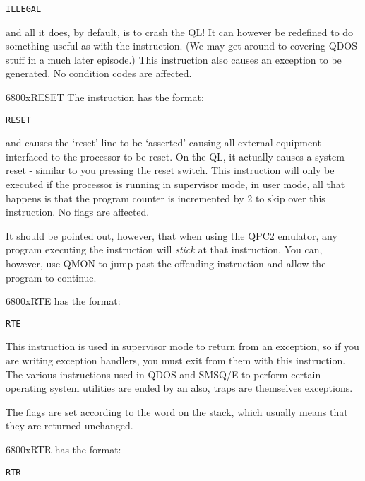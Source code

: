\begin{lstlisting}[firstnumber=1,]
          ILLEGAL
\end{lstlisting}

and all it does, by default, is to crash the QL! It can however
      be redefined to do something useful as with the  instruction. (We may
      get around to covering QDOS stuff in a much later episode.) This
      instruction also causes an exception to be generated. No condition codes
      are affected.
      
      
\mc6800x{RESET}
The  instruction has the format:

\begin{lstlisting}[firstnumber=1,]
          RESET
\end{lstlisting}

and causes the `reset' line to be `asserted' causing all external
      equipment interfaced to the processor to be reset. On the QL, it
      actually causes a system reset -{} similar to you pressing the reset
      switch. This instruction will only be executed if the processor is
      running in supervisor mode, in user mode, all that happens is that the
      program counter is incremented by 2 to skip over this instruction. No
      flags are affected.

It should be pointed out, however, that when using the QPC2 emulator, any program executing the  instruction will \emph{stick} at that instruction. You can, however, use QMON to jump past the offending instruction and allow the program to continue.

\mc6800x{RTE}
 has the format:

\begin{lstlisting}[firstnumber=1,]
          RTE
\end{lstlisting}

This instruction is used in supervisor mode to return from an exception, so if you are writing exception handlers, you must exit from them with this instruction. The various  instructions used in QDOS and SMSQ/E to perform certain operating system utilities are ended by an  also, traps are themselves exceptions.

The flags are set according to the word on the stack, which usually means that they are returned unchanged.

\mc6800x{RTR}
 has the format:

\begin{lstlisting}[firstnumber=1,]
          RTR
\end{lstlisting}

